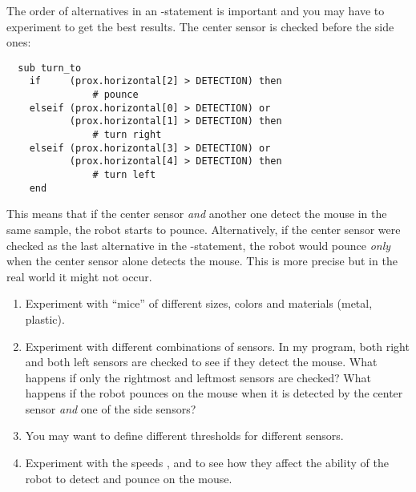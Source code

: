 The order of alternatives in an -statement is important and you
may have to experiment to get the best results. The center sensor is
checked before the side ones:

\begin{verbatim}
  sub turn_to
    if     (prox.horizontal[2] > DETECTION) then
               # pounce
    elseif (prox.horizontal[0] > DETECTION) or
           (prox.horizontal[1] > DETECTION) then
               # turn right
    elseif (prox.horizontal[3] > DETECTION) or
           (prox.horizontal[4] > DETECTION) then
               # turn left
    end
\end{verbatim}
This means that if the center sensor \emph{and} another one detect the
mouse in the same sample, the robot starts to pounce. Alternatively,
if the center sensor were checked as the last alternative in the
-statement, the robot would pounce \emph{only} when the center
sensor alone detects the mouse. This is more precise but in the real
world it might not occur.



\begin{enumerate}

\item Experiment with ``mice'' of different sizes,
colors and materials (metal, plastic).

\item Experiment with different combinations of sensors. In my program,
both right and both left sensors are checked to see if they detect the
mouse. What happens if only the rightmost and leftmost sensors are
checked? What happens if the robot pounces on the mouse when it is
detected by the center sensor \emph{and} one of the side sensors?

\item You may want to define different thresholds for different sensors.

\item Experiment with the speeds ,  and  to
see how they affect the ability of the robot to detect and pounce on the
mouse.

\end{enumerate}
